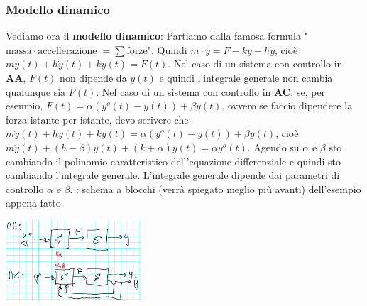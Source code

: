 \subsubsection*{Modello dinamico}
Vediamo ora il \textbf{modello dinamico}:
Partiamo dalla famosa formula "$\text{massa} \cdot \text{accellerazione}\; = \sum \text{forze}$".\newline
Quindi $m \cdot \ddot{y} = F - ky - h \dot{y}$, cioè $m \ddot{y}(t) + h \dot{y}(t) + k y(t) = F(t)$.\newline
\newline
Nel caso di un sistema con controllo in \textbf{AA}, $F(t)$ non dipende da $y(t)$ e quindi l'integrale generale non cambia qualunque sia $F(t)$.\newline
\newline
Nel caso di un sistema con controllo in \textbf{AC}, se, per esempio, $F(t) = \alpha(y^o(t) -y(t)) + \beta \dot{y}(t)$, ovvero se faccio dipendere la forza istante per istante, devo scrivere che $m \ddot{y}(t) + h \dot{y}(t) + k y(t) = \alpha(y^o(t) - y(t) ) + \beta \dot{y}(t)$, cioè $m \ddot{y}(t) + (h - \beta) \dot{y}(t) + (k + \alpha)y(t) = \alpha y^o(t)$. Agendo su $\alpha$ e $\beta$ sto cambiando il polinomio caratteristico dell'equazione differenziale e quindi sto cambiando l'integrale generale. L'integrale generale dipende dai parametri di controllo $\alpha$ e $\beta$.\newline
{}: schema a blocchi (verrà spiegato meglio più avanti) dell'esempio appena fatto.
\begin{center}
    \includegraphics[height=3cm]{../lezione1/img7.PNG}
\end{center}